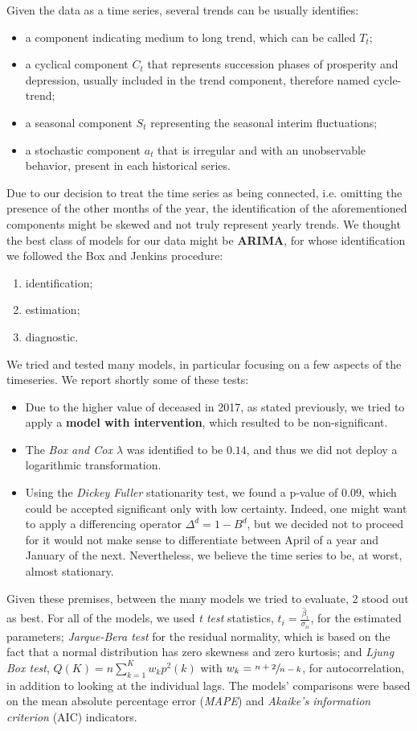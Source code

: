 \documentclass[11pt,a4paper,final]{paper}
\begin{document}
Given the data as a time series, several trends can be usually identifies:\cite{analisi_statistica}
\begin{itemize}
	\item a component indicating medium to long trend, which can be called $T_t$;
	\item a cyclical component $C_t$ that represents succession phases of prosperity and depression, usually included in the trend component, therefore named cycle-trend;
	\item a seasonal component $S_t$ representing the seasonal interim fluctuations;
	\item a stochastic component $a_t$ that is irregular and with an unobservable behavior, present in each historical series.
\end{itemize}
Due to our decision to treat the time series as being connected, i.e. omitting the presence of the other months of the year, the identification of the aforementioned components might be skewed and not truly represent yearly trends. 
We thought the best class of models for our data might be \textbf{ARIMA}, for whose identification we followed the Box and Jenkins procedure:
\begin{enumerate}
	\item identification;
	\item estimation;
	\item diagnostic.
\end{enumerate}
We tried and tested many models, in particular focusing on a few aspects of the timeseries. We report shortly some of these tests:
\begin{itemize}
	\item Due to the higher value of deceased in 2017, as stated previously, we tried to apply a \textbf{model with intervention}, which resulted to be non-significant. \cite{box1975intervention}
	\item The \textit{Box and Cox $\lambda$} was identified to be $0.14$, and thus we did not deploy a logarithmic transformation.
	\item Using the \textit{Dickey Fuller} stationarity test, we found a p-value of $0.09$, which could be accepted significant only with low certainty. Indeed, one might want to apply a differencing operator $\Delta ^d = 1 - B^d$, but we decided not to proceed for it would not make sense to differentiate between April of a year and January of the next. Nevertheless, we believe the time series to be, at worst, almost stationary. 
\end{itemize}
Given these premises, between the many models we tried to evaluate, 2 stood out as best. For all of the models, we used \textit{t test} statistics, $t_i = \frac{\hat \beta_i}{\sigma_{ii}}$, for the estimated parameters; \textit{Jarque-Bera test} for the residual normality, which is based on the fact that a normal distribution has zero skewness and zero kurtosis; and \textit{Ljung Box test}, $Q(K) = n \sum_{k=1}^K w_k p^2(k)$ with $w_k = \sfrac {n+2}{n-k}$, for autocorrelation, in addition to looking at the individual lags.
The models' comparisons were based on the mean absolute percentage error (\textit{MAPE}) and \textit{Akaike’s information criterion }(AIC) indicators. 
\end{document}
